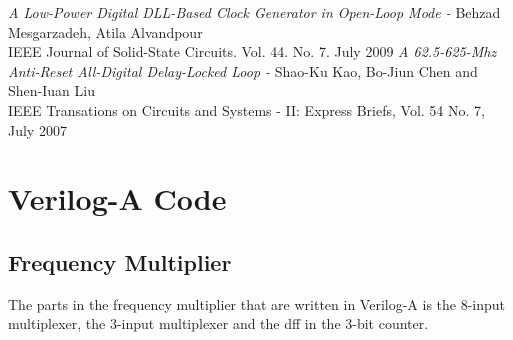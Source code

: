 \documentclass[a4paper,12pt]{article} \usepackage{graphicx}
\begin{document}
\newpage 
\appendix 
\newpage

\begin{thebibliography}{99}
\textit{A Low-Power Digital DLL-Based Clock Generator in Open-Loop Mode - }
Behzad Mesgarzadeh, Atila Alvandpour \\
IEEE Journal of Solid-State Circuits. Vol. 44. No. 7. July 2009
\textit{A 62.5-625-Mhz Anti-Reset All-Digital Delay-Locked Loop - }
Shao-Ku Kao, Bo-Jiun Chen and Shen-Iuan Liu \\
IEEE Transations on Circuits and Systems - II: Express Briefs, Vol. 54 No. 7, July 2007

\end{thebibliography}

\newpage

\section{Verilog-A Code}
\subsection{Frequency Multiplier}
The parts in the frequency multiplier that are written in Verilog-A is the 
8-input multiplexer, the 3-input multiplexer and the dff in the 3-bit counter.



\end{document}
